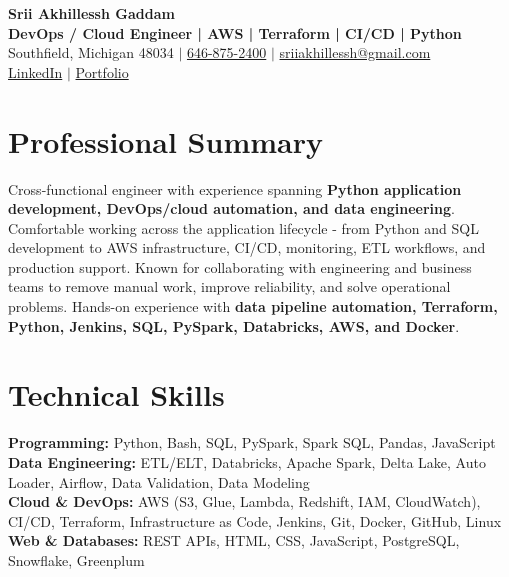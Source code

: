\documentclass[letterpaper,10pt]{article}
\begin{document}
\fontsize{9.35pt}{10.45pt}\selectfont

\begin{center}
    {\LARGE \textbf{Srii Akhillessh Gaddam}} \\[-1pt]
    \textbf{DevOps / Cloud Engineer | AWS | Terraform | CI/CD | Python} \\[2pt]
    Southfield, Michigan 48034 $|$
    \href{tel:6468752400}{646-875-2400} $|$
    \href{mailto:sriiakhillessh@gmail.com}{sriiakhillessh@gmail.com} \\[1pt]
    \href{https://www.linkedin.com/in/srii-akhiilessh-gaddam-b48668191/}{LinkedIn} $|$
    \href{https://sriiakhillesshg.github.io/portfolio/}{Portfolio}
\end{center}
\vspace{-8pt}

\section{Professional Summary}
\small{Cross-functional engineer with experience spanning \textbf{Python application development, DevOps/cloud automation, and data engineering}. Comfortable working across the application lifecycle - from Python and SQL development to AWS infrastructure, CI/CD, monitoring, ETL workflows, and production support. Known for collaborating with engineering and business teams to remove manual work, improve reliability, and solve operational problems. Hands-on experience with \textbf{data pipeline automation, Terraform, Python, Jenkins, SQL, PySpark, Databricks, AWS, and Docker}.}

\section{Technical Skills}
\small{
\textbf{Programming:} Python, Bash, SQL, PySpark, Spark SQL, Pandas, JavaScript \\
\textbf{Data Engineering:} ETL/ELT, Databricks, Apache Spark, Delta Lake, Auto Loader, Airflow, Data Validation, Data Modeling \\
\textbf{Cloud \& DevOps:} AWS (S3, Glue, Lambda, Redshift, IAM, CloudWatch), CI/CD, Terraform, Infrastructure as Code, Jenkins, Git, Docker, GitHub, Linux \\
\textbf{Web \& Databases:} REST APIs, HTML, CSS, JavaScript, PostgreSQL, Snowflake, Greenplum
}
\end{document}
